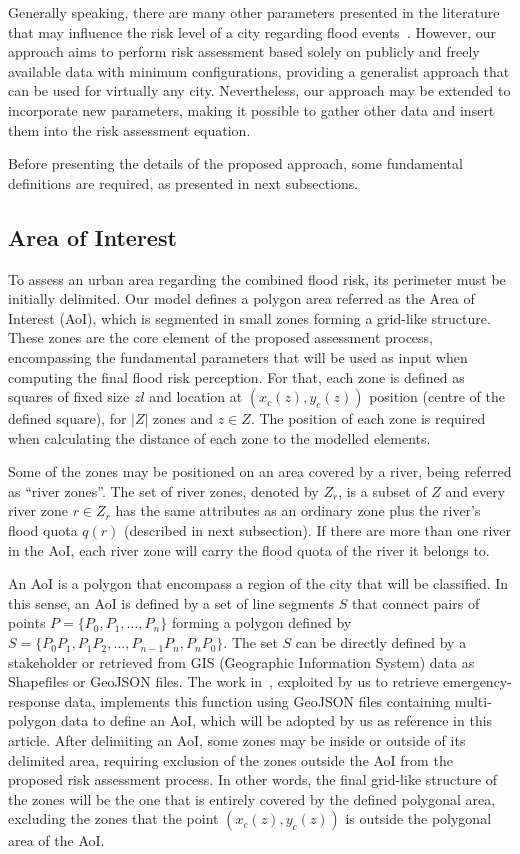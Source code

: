 \begin{refsection}
Generally speaking, there are many other parameters presented in the literature that may influence the risk level of a city regarding flood events~\cite{survey_flood}. However, our approach aims to perform risk assessment based solely on publicly and freely available data with minimum configurations, providing a generalist approach that can be used for virtually any city. Nevertheless, our approach may be extended to incorporate new parameters, making it possible to gather other data and insert them into the risk assessment equation.

Before presenting the details of the proposed approach, some fundamental definitions are required, as presented in next subsections.

\subsection{Area of Interest}

To assess an urban area regarding the combined flood risk, its perimeter must be initially delimited. Our model defines a polygon area referred as the Area of Interest (AoI), which is segmented in small zones forming a grid-like structure. These zones are the core element of the proposed assessment process, encompassing the fundamental parameters that will be used as input when computing the final flood risk perception. For that, each zone is defined as squares of fixed size $zl$ and location at $(x_c(z), y_c(z))$ position (centre of the defined square), for $|Z|$ zones and $z \in Z$. The position of each zone is required when calculating the distance of each zone to the modelled elements.

Some of the zones may be positioned on an area covered by a river, being referred as ``river zones''. The set of river zones, denoted by $Z_r$, is a subset of $Z$ and every river zone $r \in Z_r$ has the same attributes as an ordinary zone plus the river's flood quota $q(r)$ (described in next subsection). If there are more than one river in the AoI, each river zone will carry the flood quota of the river it belongs to.

An AoI is a polygon that encompass a region of the city that will be classified. In this sense, an AoI is defined by a set of line segments $S$ that connect pairs of points $P = \{P_0, P_1, ..., P_n\}$ forming a polygon defined by $S = \{P_0P_1, P_1P_2, ..., P_{n-1}P_n, P_nP_0\}$. The set $S$ can be directly defined by a stakeholder or retrieved from GIS (Geographic Information System) data as Shapefiles or GeoJSON files. The work in~\cite{cityzones}, exploited by us to retrieve emergency-response data, implements this function using GeoJSON files containing multi-polygon data to define an AoI, which will be adopted by us as reference in this article. After delimiting an AoI, some zones may be inside or outside of its delimited area, requiring exclusion of the zones outside the AoI from the proposed risk assessment process. In other words, the final grid-like structure of the zones will be the one that is entirely covered by the defined polygonal area, excluding the zones that the point $(x_c(z), y_c(z))$ is outside the polygonal area of the AoI.


\end{refsection}
